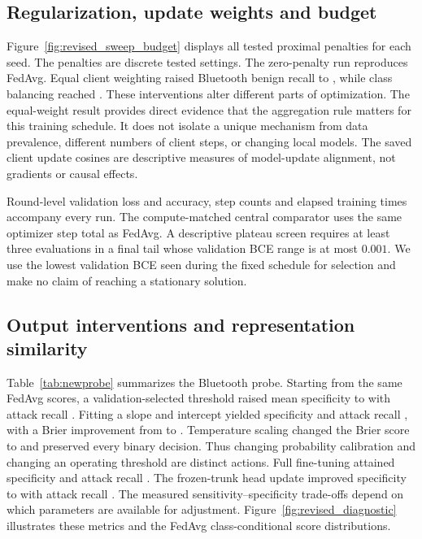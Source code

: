 \documentclass[nolineno]{ieeeaccess}
\begin{document}
\RevisionDetection

\subsection{Regularization, update weights and budget}
Figure~\ref{fig:revised_sweep_budget} displays all tested proximal penalties for each seed. The penalties are discrete tested settings. The zero-penalty run reproduces FedAvg. Equal client weighting raised Bluetooth benign recall to \RevisionEqualB{}, while class balancing reached \RevisionBalancedB{}. These interventions alter different parts of optimization. The equal-weight result provides direct evidence that the aggregation rule matters for this training schedule. It does not isolate a unique mechanism from data prevalence, different numbers of client steps, or changing local models. The saved client update cosines are descriptive measures of model-update alignment, not gradients or causal effects.

Round-level validation loss and accuracy, step counts and elapsed training times accompany every run. The compute-matched central comparator uses the same optimizer step total as FedAvg. A descriptive plateau screen requires at least three evaluations in a final tail whose validation BCE range is at most $0.001$. We use the lowest validation BCE seen during the fixed schedule for selection and make no claim of reaching a stationary solution.

\RevisionBudget

\subsection{Output interventions and representation similarity}
Table~\ref{tab:newprobe} summarizes the Bluetooth probe. Starting from the same FedAvg scores, a validation-selected threshold raised mean specificity to \RevisionThresholdB{} with attack recall \RevisionThresholdA{}. Fitting a slope and intercept yielded specificity \RevisionPlattB{} and attack recall \RevisionPlattA{}, with a Brier improvement from \RevisionProbeAvgBrier{} to \RevisionPlattBrier{}. Temperature scaling changed the Brier score to \RevisionTemperatureBrier{} and preserved every binary decision. Thus changing probability calibration and changing an operating threshold are distinct actions. Full fine-tuning attained specificity \RevisionTuneB{} and attack recall \RevisionTuneA{}. The frozen-trunk head update improved specificity to \RevisionHeadB{} with attack recall \RevisionHeadA{}. The measured sensitivity--specificity trade-offs depend on which parameters are available for adjustment. Figure~\ref{fig:revised_diagnostic} illustrates these metrics and the FedAvg class-conditional score distributions.
\end{document}
